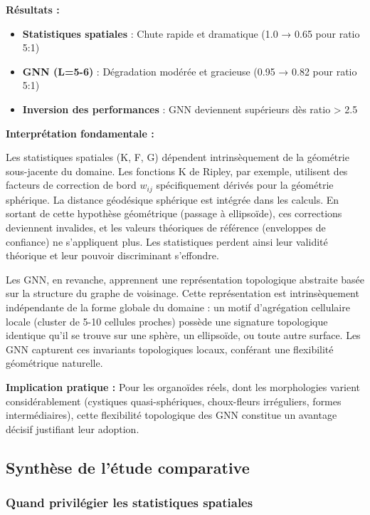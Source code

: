\textbf{Résultats :}
\begin{itemize}
    \item \textbf{Statistiques spatiales} : Chute rapide et dramatique (1.0 → 0.65 pour ratio 5:1)
    \item \textbf{GNN (L=5-6)} : Dégradation modérée et gracieuse (0.95 → 0.82 pour ratio 5:1)
    \item \textbf{Inversion des performances} : GNN deviennent supérieurs dès ratio > 2.5
\end{itemize}

\textbf{Interprétation fondamentale :}

Les statistiques spatiales (K, F, G) dépendent intrinsèquement de la géométrie sous-jacente du domaine. Les fonctions K de Ripley, par exemple, utilisent des facteurs de correction de bord $w_{ij}$ spécifiquement dérivés pour la géométrie sphérique. La distance géodésique sphérique est intégrée dans les calculs. En sortant de cette hypothèse géométrique (passage à ellipsoïde), ces corrections deviennent invalides, et les valeurs théoriques de référence (enveloppes de confiance) ne s'appliquent plus. Les statistiques perdent ainsi leur validité théorique et leur pouvoir discriminant s'effondre.

Les GNN, en revanche, apprennent une représentation topologique abstraite basée sur la structure du graphe de voisinage. Cette représentation est intrinsèquement indépendante de la forme globale du domaine : un motif d'agrégation cellulaire locale (cluster de 5-10 cellules proches) possède une signature topologique identique qu'il se trouve sur une sphère, un ellipsoïde, ou toute autre surface. Les GNN capturent ces invariants topologiques locaux, conférant une flexibilité géométrique naturelle.

\textbf{Implication pratique :} Pour les organoïdes réels, dont les morphologies varient considérablement (cystiques quasi-sphériques, choux-fleurs irréguliers, formes intermédiaires), cette flexibilité topologique des GNN constitue un avantage décisif justifiant leur adoption.

\subsection{Synthèse de l'étude comparative}

\subsubsection{Quand privilégier les statistiques spatiales}


